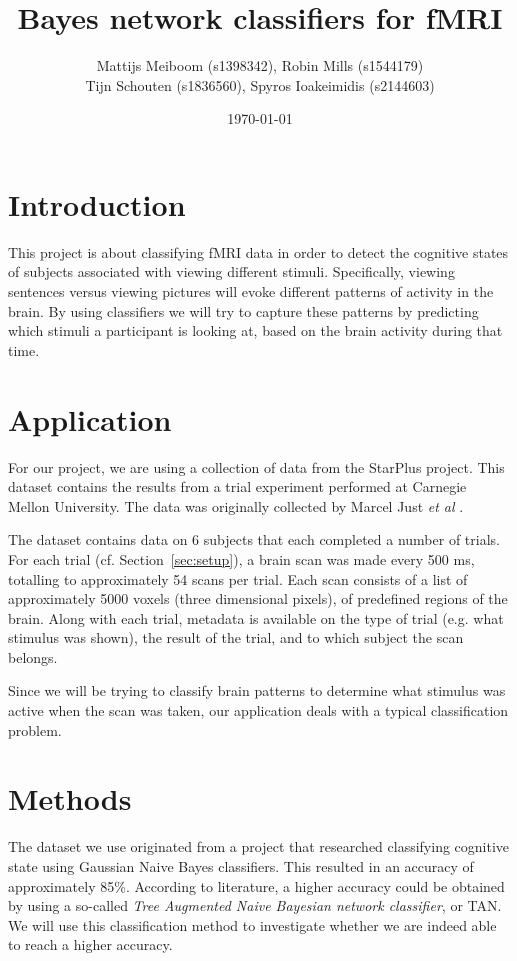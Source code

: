 \documentclass[a4paper, 11pt]{scrartcl}
\title{\Large Bayes network classifiers for fMRI}
\author{\small Mattijs Meiboom (s1398342), Robin Mills (s1544179)\\
			\small Tijn Schouten (s1836560), Spyros Ioakeimidis (s2144603)}
\date{\small \today}
\begin{document}
\maketitle

\thispagestyle{empty}

\section{Introduction}

This project is about classifying fMRI data in order to detect the cognitive states of subjects associated with viewing different stimuli. Specifically, viewing sentences versus viewing pictures will evoke different patterns of activity in the brain. By using classifiers we will try to capture these patterns by predicting which stimuli a participant is looking at, based on the brain activity during that time.

\section{Application}
\label{sec:application}

For our project, we are using a collection of data from the StarPlus project. This dataset contains the results from a trial experiment performed at Carnegie Mellon University. The data was originally collected by Marcel Just \textit{et al} \cite{StarPlus:2004kx}.

The dataset contains data on 6 subjects that each completed a number of trials. For each trial (cf. Section~\ref{sec:setup}), a brain scan was made every 500 ms, totalling to approximately 54 scans per trial. Each scan consists of a list of approximately 5000 voxels (three dimensional pixels), of predefined regions of the brain. Along with each trial, metadata is available on the type of trial (e.g. what stimulus was shown), the result of the trial, and to which subject the scan belongs.

Since we will be trying to classify brain patterns to determine what stimulus was active when the scan was taken, our application deals with a typical classification problem.

\section{Methods}
\label{sec:methods}

The dataset we use originated from a project that researched classifying cognitive state using Gaussian Naive Bayes classifiers. This resulted in an accuracy of approximately 85\%. According to literature, a higher accuracy could be obtained by using a so-called \textit{Tree Augmented Naive Bayesian network classifier}, or TAN\cite{Friedman:1997gw}. We will use this classification method to investigate whether we are indeed able to reach a higher accuracy.
\end{document}
